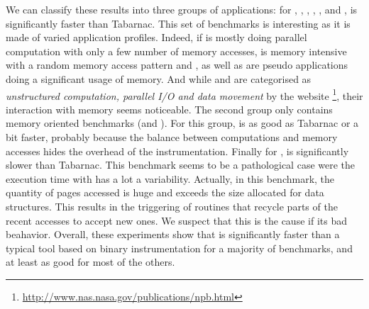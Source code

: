 We can classify these results into three groups of
applications:  for \BT, \DC, \EP, \IS, \LU, \SP and \UA, \Moca is
significantly faster than Tabarnac. This set of benchmarks is interesting as it is made of varied application profiles.
Indeed, if \EP is mostly doing parallel computation with only a few number of
memory accesses, \IS is memory intensive with a random memory access pattern and
\BT, \LU as well as \SP are pseudo applications doing a significant usage of memory.
And while \DC and \UA are categorised as \emph{unstructured computation,
parallel I/O and data movement} by the \NPB website
\footnote{\url{http://www.nas.nasa.gov/publications/npb.html}}, their interaction with memory seems noticeable.
The second group only contains memory oriented benchmarks (\CG and \FT). For this group,
\Moca is as good as Tabarnac or a bit faster, probably because the balance between computations and memory accesses hides the overhead of the instrumentation.
Finally for \MG, \Moca is
significantly slower than Tabarnac. This benchmark seems to be a pathological
case were the execution time with \Moca has a lot a variability. Actually, in this benchmark, the quantity of pages accessed is huge and exceeds the size
allocated for \Moca data structures. This results in the triggering of \Moca routines that recycle parts of the recent accesses to accept new ones.
We suspect that this is the cause if its bad beahavior.
Overall, these experiments show that \Moca is significantly faster than a typical tool based on binary instrumentation
for a majority of benchmarks, and at least as good for most of the others.



